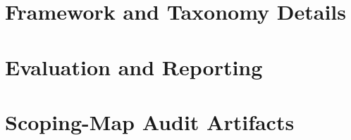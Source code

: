 \documentclass[11pt]{article}
\begin{document}
\section{Framework and Taxonomy Details}







\FloatBarrier
\section{Evaluation and Reporting}
\label{sec:appendix-eval}




\FloatBarrier
\section{Scoping-Map Audit Artifacts}
\label{sec:audit-artifacts}





\FloatBarrier
\end{document}
